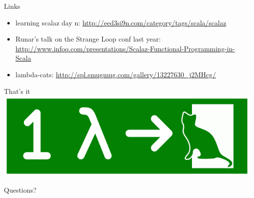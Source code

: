 \documentclass{beamer}
\begin{document}
\begin{frame}[fragile]{Links}
  \begin{center}
      \begin{itemize}
        \item learning scalaz day n: \url{http://eed3si9n.com/category/tags/scala/scalaz}
        \item Runar's talk on the Strange Loop conf last year: \url{http://www.infoq.com/presentations/Scalaz-Functional-Programming-in-Scala}
        \item lambda-cats: \url{http://spl.smugmug.com/gallery/13227630_j2MHcg/}
      \end{itemize}
  \end{center}
\end{frame}

\begin{frame}{That's it}
  \includegraphics[scale=0.4]{img/escape}\newline
  \Huge \centerline{Questions?}
\end{frame}
\end{document}
